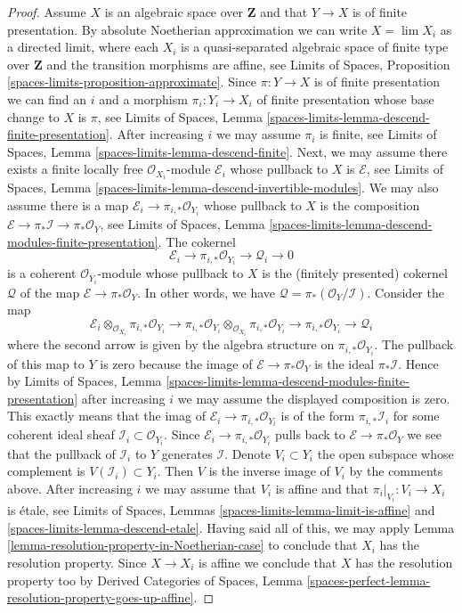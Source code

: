 \documentclass[10pt,a4paper]{amsart}
\theoremstyle{plain}
\theoremstyle{definition}
\theoremstyle{remark}
\numberwithin{equation}{subsection}
\def\lim{\mathop{\mathrm{lim}}\nolimits}
\begin{document}
\begin{proof}
\medskip\noindent
Assume $X$ is an algebraic space over $\mathbf{Z}$ and that
$Y \to X$ is of finite presentation. By absolute Noetherian
approximation we can write $X = \lim X_i$ as a directed limit,
where each $X_i$ is a quasi-separated algebraic space of finite type
over $\mathbf{Z}$ and the transition morphisms are affine, see
Limits of Spaces, Proposition \ref{spaces-limits-proposition-approximate}.
Since $\pi : Y \to X$ is of finite presentation we can find an $i$
and a morphism $\pi_i : Y_i \to X_i$ of finite presentation
whose base change to $X$ is $\pi$, see
Limits of Spaces, Lemma
\ref{spaces-limits-lemma-descend-finite-presentation}.
After increasing $i$ we may assume $\pi_i$ is finite, see
Limits of Spaces, Lemma
\ref{spaces-limits-lemma-descend-finite}.
Next, we may assume there exists a finite locally
free $\mathcal{O}_{X_i}$-module $\mathcal{E}_i$
whose pullback to $X$ is $\mathcal{E}$, see
Limits of Spaces, Lemma \ref{spaces-limits-lemma-descend-invertible-modules}.
We may also assume there is a map
$\mathcal{E}_i \to \pi_{i, *}\mathcal{O}_{Y_i}$
whose pullback to $X$ is the composition
$\mathcal{E} \to \pi_*\mathcal{I} \to \pi_*\mathcal{O}_Y$, see
Limits of Spaces, Lemma
\ref{spaces-limits-lemma-descend-modules-finite-presentation}.
The cokernel
$$
\mathcal{E}_i \to \pi_{i, *}\mathcal{O}_{Y_i} \to \mathcal{Q}_i \to 0
$$
is a coherent $\mathcal{O}_{Y_i}$-module whose pullback to $X$
is the (finitely presented) cokernel $\mathcal{Q}$ of the map
$\mathcal{E} \to \pi_*\mathcal{O}_Y$. In other words, we have
$\mathcal{Q} = \pi_*(\mathcal{O}_Y/\mathcal{I})$. Consider
the map
$$
\mathcal{E}_i
\otimes_{\mathcal{O}_{X_i}}
\pi_{i, *} \mathcal{O}_{Y_i}
\longrightarrow
\pi_{i, *}\mathcal{O}_{Y_i}
\otimes_{\mathcal{O}_{X_i}}
\pi_{i, *} \mathcal{O}_{Y_i}
\to
\pi_{i, *} \mathcal{O}_{Y_i}
\to
\mathcal{Q}_i
$$
where the second arrow is given by the algebra structure
on $\pi_{i, *}\mathcal{O}_{Y_i}$. The pullback of this map
to $Y$ is zero because the image of $\mathcal{E} \to \pi_*\mathcal{O}_Y$
is the ideal $\pi_*\mathcal{I}$. Hence by
Limits of Spaces, Lemma
\ref{spaces-limits-lemma-descend-modules-finite-presentation}
after increasing $i$ we may assume the displayed composition
is zero. This exactly means that the imag of
$\mathcal{E}_i \to \pi_{i, *}\mathcal{O}_{Y_i}$
is of the form $\pi_{i, *}\mathcal{I}_i$
for some coherent ideal sheaf $\mathcal{I}_i \subset \mathcal{O}_{Y_i}$.
Since $\mathcal{E}_i \to \pi_{i, *}\mathcal{O}_{Y_i}$
pulls back to $\mathcal{E} \to \pi_*\mathcal{O}_Y$ we
see that the pullback of $\mathcal{I}_i$ to $Y$ generates $\mathcal{I}$.
Denote $V_i \subset Y_i$ the open subspace whose complement
is $V(\mathcal{I}_i) \subset Y_i$. Then $V$ is the inverse image
of $V_i$ by the comments above. After increasing $i$ we may assume
that $V_i$ is affine and that $\pi_i|_{V_i} : V_i \to X_i$ is 
\'etale, see
Limits of Spaces, Lemmas
\ref{spaces-limits-lemma-limit-is-affine} and
\ref{spaces-limits-lemma-descend-etale}.
Having said all of this, we may apply
Lemma \ref{lemma-resolution-property-in-Noetherian-case}
to conclude that $X_i$ has the
resolution property. Since $X \to X_i$ is affine
we conclude that $X$ has the resolution property too
by Derived Categories of Spaces, Lemma
\ref{spaces-perfect-lemma-resolution-property-goes-up-affine}.
\end{proof}
\end{document}
